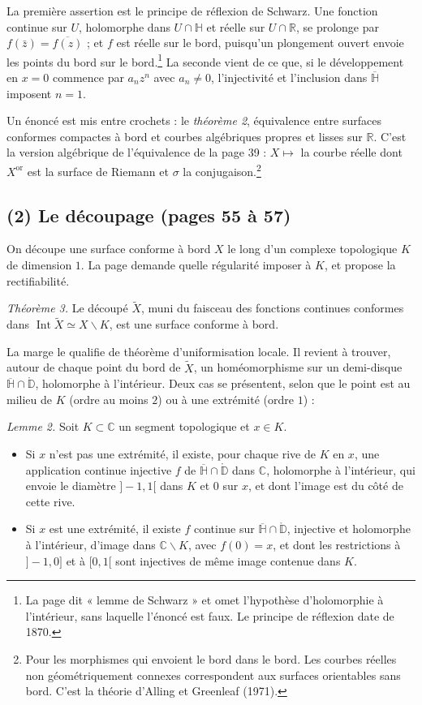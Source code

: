 \documentclass[11pt,a4paper]{article}
\begin{document}
La première assertion est le principe de réflexion de Schwarz. Une fonction
continue sur $U$, holomorphe dans $U \cap \mathbb{H}$ et réelle sur
$U \cap \mathbb{R}$, se prolonge par $f(\bar z) = \overline{f(z)}$ ; et $f$
est réelle sur le bord, puisqu'un plongement ouvert envoie les points du bord
sur le bord.\footnote{La page dit « lemme de Schwarz » et omet l'hypothèse
d'holomorphie à l'intérieur, sans laquelle l'énoncé est faux. Le principe de
réflexion date de 1870.} La seconde vient de ce que, si le développement en
$x = 0$ commence par $a_n z^{n}$ avec $a_n \neq 0$, l'injectivité et
l'inclusion dans $\overline{\mathbb{H}}$ imposent $n = 1$.

Un énoncé est mis entre crochets : le \emph{théorème 2}, équivalence entre
surfaces conformes compactes à bord et courbes algébriques propres et lisses
sur $\mathbb{R}$. C'est la version algébrique de l'équivalence de la
page 39 : $X \mapsto$ la courbe réelle dont $X^{\mathrm{or}}$ est la
surface de Riemann et $\sigma$ la conjugaison.\footnote{Pour les morphismes
qui envoient le bord dans le bord. Les courbes réelles non géométriquement
connexes correspondent aux surfaces orientables sans bord. C'est la théorie
d'Alling et Greenleaf (1971).}

\subsection*{(2) Le découpage (pages 55 à 57)}

On découpe une surface conforme à bord $X$ le long d'un complexe topologique
$K$ de dimension $1$. La page demande quelle régularité imposer à $K$, et
propose la rectifiabilité.

\emph{Théorème 3.} Le découpé $\widetilde{X}$, muni du faisceau des fonctions
continues conformes dans $\operatorname{Int}\widetilde{X} \simeq X
\smallsetminus K$, est une surface conforme à bord.

La marge le qualifie de théorème d'uniformisation locale. Il revient à
trouver, autour de chaque point du bord de $\widetilde{X}$, un homéomorphisme
sur un demi-disque $\overline{\mathbb{H}} \cap \mathring{\mathbb{D}}$,
holomorphe à l'intérieur. Deux cas se présentent, selon que le point est au
milieu de $K$ (ordre au moins $2$) ou à une extrémité (ordre $1$) :

\emph{Lemme 2.} Soit $K \subset \mathbb{C}$ un segment topologique et $x \in
K$.
\begin{itemize}
  \item[a)] Si $x$ n'est pas une extrémité, il existe, pour chaque rive de
  $K$ en $x$, une application continue injective $f$ de
  $\overline{\mathbb{H}} \cap \mathring{\mathbb{D}}$ dans $\mathbb{C}$,
  holomorphe à l'intérieur, qui envoie le diamètre $]-1,1[$ dans $K$ et $0$
  sur $x$, et dont l'image est du côté de cette rive.
  \item[b)] Si $x$ est une extrémité, il existe $f$ continue sur
  $\overline{\mathbb{H}} \cap \mathring{\mathbb{D}}$, injective et holomorphe à
  l'intérieur, d'image dans $\mathbb{C} \smallsetminus K$, avec $f(0) = x$,
  et dont les restrictions à $]-1,0]$ et à $[0,1[$ sont injectives de même
  image contenue dans $K$.
\end{itemize}
\end{document}
